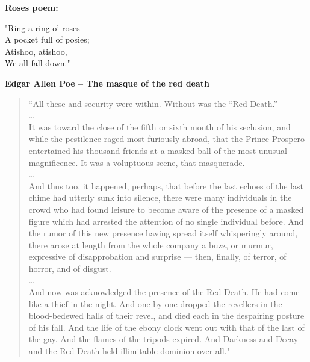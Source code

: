 \textbf{Roses poem:}\\

\begin{center}
"Ring-a-ring o’ roses\\
A pocket full of posies;\\
Atishoo, atishoo,\\
We all fall down."
\end{center}

\noindent
\textbf{Edgar Allen Poe -- The masque of the red death}
\begin{center}
\begin{quotation}
\noindent
``All these and security were within. Without was the “Red Death.” \cite{poe2020masque}\\

\noindent
\hfill \dots \hfill\\

\noindent
It was toward the close of the fifth or sixth month of his seclusion, and while the pestilence raged
most furiously abroad, that the Prince Prospero entertained his thousand friends at a masked ball of the
most unusual magnificence.
It was a voluptuous scene, that masquerade.\\

\noindent
\hfill \dots \hfill  \\

\noindent
And thus too, it happened, perhaps, that before
the last echoes of the last chime had utterly sunk into silence, there were many individuals in the crowd
who had found leisure to become aware of the presence of a masked figure which had arrested the
attention of no single individual before. And the rumor of this new presence having spread itself
whisperingly around, there arose at length from the whole company a buzz, or murmur, expressive of
disapprobation and surprise — then, finally, of terror, of horror, and of disgust.\\

\noindent
\hfill \dots \hfill \\

\noindent
And now was acknowledged the presence of the Red Death. He had come like a thief in the night.
And one by one dropped the revellers in the blood-bedewed halls of their revel, and died each in the
despairing posture of his fall. And the life of the ebony clock went out with that of the last of the gay.
And the flames of the tripods expired. And Darkness and Decay and the Red Death held illimitable
dominion over all."
\end{quotation}
\end{center}


